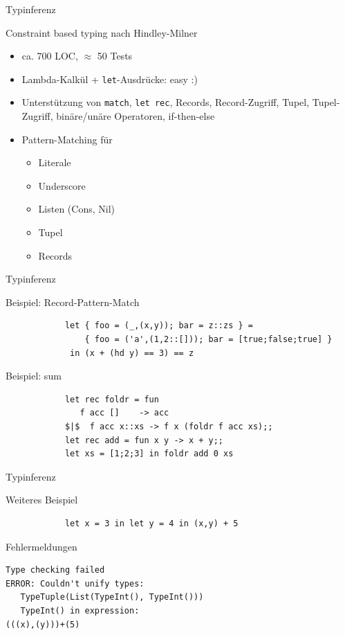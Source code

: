 \documentclass[hyperref={pdfpagelabels=false}]{beamer}
\begin{document}
\begin{frame}{Typinferenz}
  \begin{block}{Constraint based typing nach Hindley-Milner}
    \begin{itemize}
      \item ca. 700 LOC, $\approx$ 50 Tests
      \item Lambda-Kalk\"ul + \texttt{let}-Ausdr\"ucke: easy :)
      \item Unterst\"utzung von \texttt{match}, \texttt{let rec}, Records, Record-Zugriff, Tupel, Tupel-Zugriff, bin\"are/un\"are Operatoren, if-then-else
      \item Pattern-Matching f\"ur 
        \begin{itemize}
	  \item Literale
	  \item Underscore
	  \item Listen (Cons, Nil)
	  \item Tupel
	  \item Records
        \end{itemize}
    \end{itemize}
  \end{block}
\end{frame}

\begin{frame}[fragile]{Typinferenz}
  \begin{block}{Beispiel: Record-Pattern-Match}
      \begin{verbatim}
            let { foo = (_,(x,y)); bar = z::zs } =
                { foo = ('a',(1,2::[])); bar = [true;false;true] }
             in (x + (hd y) == 3) == z
      \end{verbatim}
  \end{block}
  \begin{block}{Beispiel: sum}
      \begin{verbatim}
            let rec foldr = fun
               f acc []    -> acc
            $|$  f acc x::xs -> f x (foldr f acc xs);;
            let rec add = fun x y -> x + y;;
            let xs = [1;2;3] in foldr add 0 xs
      \end{verbatim}
  \end{block}
\end{frame}

\begin{frame}[fragile]{Typinferenz}
  \begin{block}{Weiteres Beispiel}
      \begin{verbatim}
            let x = 3 in let y = 4 in (x,y) + 5
      \end{verbatim}
  \end{block}
  \begin{alertblock}{Fehlermeldungen}
  \begin{verbatim}
Type checking failed
ERROR: Couldn't unify types: 
   TypeTuple(List(TypeInt(), TypeInt()))
   TypeInt() in expression: 
(((x),(y)))+(5)
  \end{verbatim}
  \end{alertblock}
\end{frame}
\end{document}
